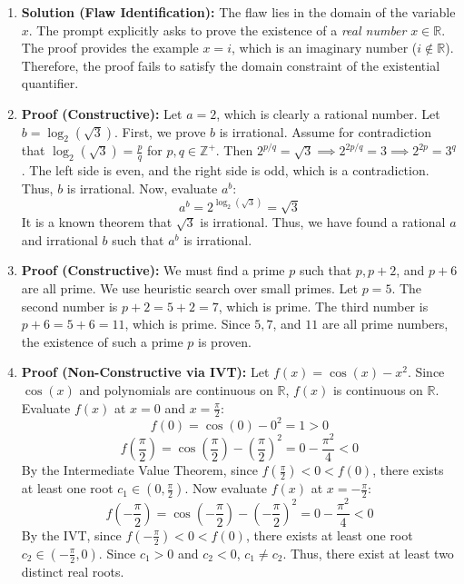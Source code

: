 \documentclass[11pt]{article}
\begin{document}
\begin{enumerate}
    \item \textbf{Solution (Flaw Identification):} The flaw lies in the domain of the variable $x$. The prompt explicitly asks to prove the existence of a \textit{real number} $x \in \mathbb{R}$. The proof provides the example $x = i$, which is an imaginary number ($i \notin \mathbb{R}$). Therefore, the proof fails to satisfy the domain constraint of the existential quantifier. \qedhere

    \item \textbf{Proof (Constructive):} Let $a = 2$, which is clearly a rational number. Let $b = \log_2(\sqrt{3})$. 
    First, we prove $b$ is irrational. Assume for contradiction that $\log_2(\sqrt{3}) = \frac{p}{q}$ for $p, q \in \mathbb{Z}^+$. Then $2^{p/q} = \sqrt{3} \implies 2^{2p/q} = 3 \implies 2^{2p} = 3^q$. The left side is even, and the right side is odd, which is a contradiction. Thus, $b$ is irrational.
    Now, evaluate $a^b$:
    \[ a^b = 2^{\log_2(\sqrt{3})} = \sqrt{3} \]
    It is a known theorem that $\sqrt{3}$ is irrational. Thus, we have found a rational $a$ and irrational $b$ such that $a^b$ is irrational. \qedhere

    \item \textbf{Proof (Constructive):} We must find a prime $p$ such that $p, p+2$, and $p+6$ are all prime. We use heuristic search over small primes.
    Let $p = 5$. 
    The second number is $p + 2 = 5 + 2 = 7$, which is prime.
    The third number is $p + 6 = 5 + 6 = 11$, which is prime.
    Since $5, 7$, and $11$ are all prime numbers, the existence of such a prime $p$ is proven. \qedhere

    \item \textbf{Proof (Non-Constructive via IVT):} Let $f(x) = \cos(x) - x^2$. Since $\cos(x)$ and polynomials are continuous on $\mathbb{R}$, $f(x)$ is continuous on $\mathbb{R}$.
    Evaluate $f(x)$ at $x = 0$ and $x = \frac{\pi}{2}$:
    \[ f(0) = \cos(0) - 0^2 = 1 > 0 \]
    \[ f\left(\frac{\pi}{2}\right) = \cos\left(\frac{\pi}{2}\right) - \left(\frac{\pi}{2}\right)^2 = 0 - \frac{\pi^2}{4} < 0 \]
    By the Intermediate Value Theorem, since $f(\frac{\pi}{2}) < 0 < f(0)$, there exists at least one root $c_1 \in (0, \frac{\pi}{2})$.
    Now evaluate $f(x)$ at $x = -\frac{\pi}{2}$:
    \[ f\left(-\frac{\pi}{2}\right) = \cos\left(-\frac{\pi}{2}\right) - \left(-\frac{\pi}{2}\right)^2 = 0 - \frac{\pi^2}{4} < 0 \]
    By the IVT, since $f(-\frac{\pi}{2}) < 0 < f(0)$, there exists at least one root $c_2 \in (-\frac{\pi}{2}, 0)$.
    Since $c_1 > 0$ and $c_2 < 0$, $c_1 \neq c_2$. Thus, there exist at least two distinct real roots. \qedhere


\end{enumerate}
\end{document}
